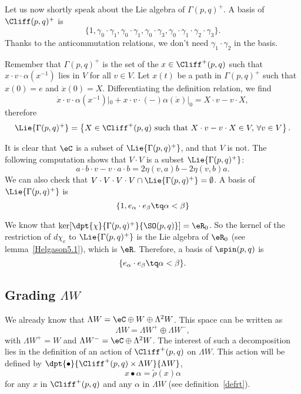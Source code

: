 Let us now shortly speak about the Lie algebra of $\Gamma(p,q)^+$. A basis of $\Cliff(p,q)^+$ is \[\{1,\gamma_0\cdot\gamma_1,\gamma_0\cdot\gamma_1 ,\gamma_0\cdot\gamma_3
,\gamma_0\cdot\gamma_1\cdot\gamma_2\cdot\gamma_3  \}.\] Thanks to the anticommutation relations, we don't need $\gamma_1\cdot\gamma_2$ in the basis.

Remember that $\Gamma(p,q)^+$ is the set of the $x\in\Cliff^+(p,q)$ such that $x\cdot v\cdot\alpha(x^{-1})$ lies in $V$ for all $v\in V$. Let $x(t)$ be a path in $\Gamma(p,q)^+$ such that $x(0)=e$ and $\dot{x}(0)=X$. Differentiating the definition relation, we find
 \[
 \dot{x}\cdot v\cdot\alpha(x^{-1})|_0+x\cdot v\cdot(-)\alpha(\dot{x})|_0=X\cdot v-v\cdot X,
 \]
 therefore
\[
  \Lie{\Gamma(p,q)^+}=\left\{X\in\Cliff^+(p,q)\textrm{ such that } X\cdot v-v\cdot X\in V,\,\forall v\in V\right\}.
\]

It is clear that $\eC$ is a subset of $\Lie{\Gamma(p,q)^+}$, and that $V$ is not. The following computation shows that $V\cdot V$ is a subset $\Lie{\Gamma(p,q)^+}$:
\[
         a\cdot b\cdot v-v\cdot a\cdot b=2\eta(v,a)b-2\eta(v,b)a.
\]
 We can also check that $V\cdot V\cdot V\cdot V\cap\Lie{\Gamma(p,q)^+}=\emptyset$. A basis of $\Lie{\Gamma(p,q)^+}$ is
\[
	\{ 1,e_{\alpha}\cdot e_{\beta}\tq \alpha<\beta \}
\]

 We know that $\ker[\dpt{\chi}{\Gamma(p,q)^+}{\SO(p,q)}]=\eR_0$. So the kernel of the restriction of $d\chi_e$ to $\Lie{\Gamma(p,q)^+}$ is the Lie algebra of $\eR_0$ (see lemma~\ref{Helgason5.1}), which is $\eR$. Therefore, a basis of $\spin(p,q)$ is
\[
	\{e_{\alpha}\cdot e_{\beta}\tq \alpha<\beta\}.
\]

\subsection{Grading \texorpdfstring{$\Lambda W$}{LW}}

We already know that $\Lambda W=\eC\oplus W\oplus\Lambda^2W$. This space can be written as \[\Lambda W =\Lambda W^+\oplus\Lambda W^-,\] with $\Lambda W^+=W$ and $\Lambda W^-=\eC\oplus\Lambda^2W$. The interest of such a decomposition lies in the definition of an action of $\Cliff^+(p,q)$ on $\Lambda W $. This action will be defined by $\dpt{\bullet}{\Cliff^+(p,q)\times\Lambda W }{\Lambda W }$,
  \[
 x\bullet\alpha=\tilde\rho(x)\alpha
 \]
for any $x$ in $\Cliff^+(p,q)$ and any $\alpha$ in $\Lambda W $ (see definition~\ref{defrt}).

